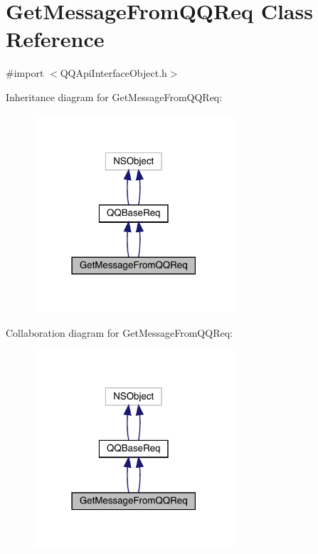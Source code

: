 \hypertarget{interface_get_message_from_q_q_req}{}\section{Get\+Message\+From\+Q\+Q\+Req Class Reference}
\label{interface_get_message_from_q_q_req}


{\ttfamily \#import $<$Q\+Q\+Api\+Interface\+Object.\+h$>$}



Inheritance diagram for Get\+Message\+From\+Q\+Q\+Req\+:\nopagebreak
\begin{figure}[H]
\begin{center}
\leavevmode
\includegraphics[width=210pt]{interface_get_message_from_q_q_req__inherit__graph}
\end{center}
\end{figure}


Collaboration diagram for Get\+Message\+From\+Q\+Q\+Req\+:\nopagebreak
\begin{figure}[H]
\begin{center}
\leavevmode
\includegraphics[width=210pt]{interface_get_message_from_q_q_req__coll__graph}
\end{center}
\end{figure}
